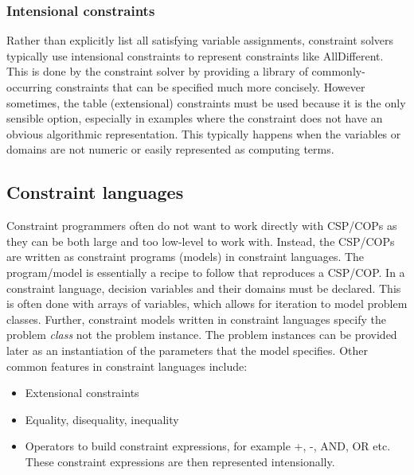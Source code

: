 \documentclass[CS4402-Notes.tex]{subfiles}
\begin{document}
\subsubsection{Intensional constraints}
Rather than explicitly list all satisfying variable assignments, constraint solvers typically use intensional constraints to represent constraints like AllDifferent. This is done by the constraint solver by providing a library of commonly-occurring constraints that can be specified much more concisely. 
\n
However sometimes, the table (extensional) constraints must be used because it is the only sensible option, especially in examples where the constraint does not have an obvious algorithmic representation. This typically happens when the variables or domains are not numeric or easily represented as computing terms. 

\subsection{Constraint languages}
Constraint programmers often do not want to work directly with CSP/COPs as they can be both large and too low-level to work with. Instead, the CSP/COPs are written as constraint programs (models) in constraint languages. The program/model is essentially a recipe to follow that reproduces a CSP/COP. 
\n
In a constraint language, decision variables and their domains must be declared. This is often done with arrays of variables, which allows for iteration to model problem classes. Further, constraint models written in constraint languages specify the problem \textit{class} not the problem instance. The problem instances can be provided later as an instantiation of the parameters that the model specifies. Other common features in constraint languages include:
\begin{itemize}
\item Extensional constraints
\item Equality, disequality, inequality
\item Operators to build constraint expressions, for example +, -, AND, OR etc. These constraint expressions are then represented intensionally. 
\end{itemize}
\end{document}
